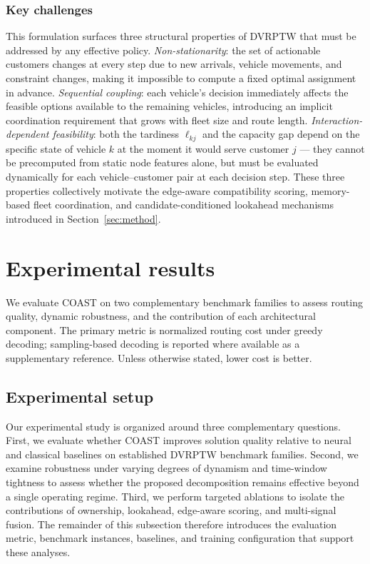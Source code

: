 \documentclass[conference]{IEEEtran}
\begin{document}
\subsubsection{Key challenges}
This formulation surfaces three structural properties of DVRPTW that must be addressed by any effective policy.
\textit{Non-stationarity}: the set of actionable customers changes at every step due to new arrivals, vehicle movements, and constraint changes, making it impossible to compute a fixed optimal assignment in advance.
\textit{Sequential coupling}: each vehicle's decision immediately affects the feasible options available to the remaining vehicles, introducing an implicit coordination requirement that grows with fleet size and route length.
\textit{Interaction-dependent feasibility}: both the tardiness $\ell_{kj}$ and the capacity gap depend on the specific state of vehicle $k$ at the moment it would serve customer $j$ --- they cannot be precomputed from static node features alone, but must be evaluated dynamically for each vehicle--customer pair at each decision step.
These three properties collectively motivate the edge-aware compatibility scoring, memory-based fleet coordination, and candidate-conditioned lookahead mechanisms introduced in Section~\ref{sec:method}.

\section{Experimental results} \label{sec:experiment}

We evaluate COAST on two complementary benchmark families to assess routing quality, dynamic robustness, and the contribution of each architectural component. The primary metric is normalized routing cost under greedy decoding; sampling-based decoding is reported where available as a supplementary reference. Unless otherwise stated, lower cost is better.

\subsection{Experimental setup}

Our experimental study is organized around three complementary questions. First, we evaluate whether COAST improves solution quality relative to neural and classical baselines on established DVRPTW benchmark families. Second, we examine robustness under varying degrees of dynamism and time-window tightness to assess whether the proposed decomposition remains effective beyond a single operating regime. Third, we perform targeted ablations to isolate the contributions of ownership, lookahead, edge-aware scoring, and multi-signal fusion. The remainder of this subsection therefore introduces the evaluation metric, benchmark instances, baselines, and training configuration that support these analyses.
\end{document}
